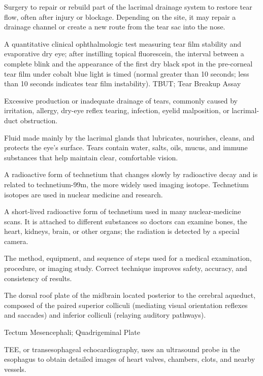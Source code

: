  Surgery to repair or rebuild part of the lacrimal drainage system to restore tear flow, often after injury or blockage. Depending on the site, it may repair a drainage channel or create a new route from the tear sac into the nose.

 A quantitative clinical ophthalmologic test measuring tear film stability and evaporative dry eye; after instilling topical fluorescein, the interval between a complete blink and the appearance of the first dry black spot in the pre-corneal tear film under cobalt blue light is timed (normal greater than 10 seconds; less than 10 seconds indicates tear film instability).
\synonyms
TBUT; Tear Breakup Assay

 Excessive production or inadequate drainage of tears, commonly caused by irritation, allergy, dry-eye reflex tearing, infection, eyelid malposition, or lacrimal-duct obstruction.

 Fluid made mainly by the lacrimal glands that lubricates, nourishes, cleans, and protects the eye's surface. Tears contain water, salts, oils, mucus, and immune substances that help maintain clear, comfortable vision.

 A radioactive form of technetium that changes slowly by radioactive decay and is related to technetium-99m, the more widely used imaging isotope. Technetium isotopes are used in nuclear medicine and research.

 A short-lived radioactive form of technetium used in many nuclear-medicine scans. It is attached to different substances so doctors can examine bones, the heart, kidneys, brain, or other organs; the radiation is detected by a special camera.

 The method, equipment, and sequence of steps used for a medical examination, procedure, or imaging study. Correct technique improves safety, accuracy, and consistency of results.

 The dorsal roof plate of the midbrain located posterior to the cerebral aqueduct, composed of the paired superior colliculi (mediating visual orientation reflexes and saccades) and inferior colliculi (relaying auditory pathways).

\synonyms
Tectum Mesencephali; Quadrigeminal Plate

 TEE, or transesophageal echocardiography, uses an ultrasound probe in the esophagus to obtain detailed images of heart valves, chambers, clots, and nearby vessels.

